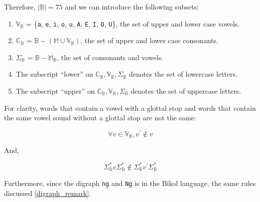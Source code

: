 Therefore, $|\mathbb{B}|=75$ and we can introduce the following subsets:
\begin{enumerate}
    \item \(\mathbb{V}_\mathbb{B}\) = \{\texttt{a}, \texttt{e}, \texttt{i}, \texttt{o}, \texttt{u}, \texttt{A}, \texttt{E}, \texttt{I}, \texttt{O}, \texttt{U}\}, the set of upper and lower case vowels.
    \item \(\mathbb{C}_\mathbb{B}\) = \(\mathbb{B} - (\mathbb{M} \cup \mathbb{V}_\mathbb{B})\),
          the set of upper and lower case consonants.
    \item \(\Sigma_\mathbb{B}\) = \(\mathbb{B} - \mathbb{M}_\mathbb{B}\), the set of consonants and vowels.
    \item The subscript “lower” on \(\mathbb{C}_\mathbb{B}, \mathbb{V}_\mathbb{B}, \Sigma_\mathbb{B}\) denotes the set of lowercase letters.
    \item The subscript “upper” on \(\mathbb{C}_\mathbb{B}, \mathbb{V}_\mathbb{B}, \Sigma_\mathbb{B}\) denotes the set of uppercase letters.
\end{enumerate}

For clarity, words that contain a vowel with a glottal stop and words that contain the same vowel sound without a glottal stop are not the same:

\[
    \forall v\in\mathbb{V}_\mathbb{B}, v^\prime\notin v
\]

And,

\[
    \Sigma_\mathbb{B}^*v\Sigma_\mathbb{B}^*\notin \Sigma_\mathbb{B}^*v^\prime\Sigma_\mathbb{B}^*
\]

Furthermore, since the digraph \texttt{ng} and \texttt{Ng} is in the Bikol language, the same rules discussed \ref{digraph_remark}.